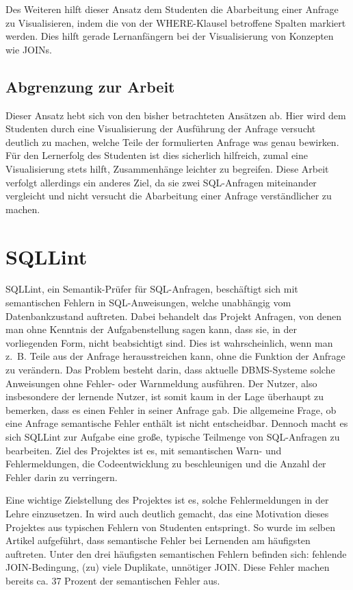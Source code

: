 Des Weiteren hilft dieser Ansatz dem Studenten die Abarbeitung einer Anfrage zu Visualisieren, indem die von der WHERE-Klausel betroffene Spalten markiert werden. Dies hilft gerade Lernanfängern bei der Visualisierung von Konzepten wie JOINs.

\subsection*{Abgrenzung zur Arbeit}

Dieser Ansatz hebt sich von den bisher betrachteten Ansätzen ab. Hier wird dem Studenten durch eine Visualisierung der Ausführung der Anfrage versucht deutlich zu machen, welche Teile der formulierten Anfrage was genau bewirken. Für den Lernerfolg des Studenten ist dies sicherlich hilfreich, zumal eine Visualisierung stets hilft, Zusammenhänge leichter zu begreifen. Diese Arbeit verfolgt allerdings ein anderes Ziel, da sie zwei SQL-Anfragen miteinander vergleicht und nicht versucht die Abarbeitung einer Anfrage verständlicher zu machen.

\section{SQLLint}

SQLLint, ein Semantik-Prüfer für SQL-Anfragen, beschäftigt sich mit semantischen Fehlern in SQL-Anweisungen, welche unabhängig vom Datenbankzustand auftreten. Dabei behandelt das Projekt Anfragen, von denen man ohne Kenntnis der Aufgabenstellung sagen kann, dass sie, in der vorliegenden Form, nicht beabsichtigt sind. Dies ist wahrscheinlich, wenn man \mbox{z. B.} Teile aus der Anfrage herausstreichen kann, ohne die Funktion der Anfrage zu verändern.  Das Problem besteht darin, dass aktuelle DBMS-Systeme solche Anweisungen ohne Fehler- oder Warnmeldung ausführen. Der Nutzer, also insbesondere der lernende Nutzer, ist somit kaum in der Lage überhaupt zu bemerken, dass es einen Fehler in seiner Anfrage gab. Die allgemeine Frage, ob eine Anfrage semantische Fehler enthält ist nicht entscheidbar. Dennoch macht es sich SQLLint zur Aufgabe eine große, typische Teilmenge von SQL-Anfragen zu bearbeiten. Ziel des Projektes ist es, mit semantischen Warn- und Fehlermeldungen, die Codeentwicklung zu beschleunigen und die Anzahl der Fehler darin zu verringern.

Eine wichtige Zielstellung des Projektes ist es, solche Fehlermeldungen in der Lehre einzusetzen. In \cite{sqllint1} wird auch deutlich gemacht, das eine Motivation dieses Projektes aus typischen Fehlern von Studenten entspringt. So wurde im selben Artikel aufgeführt, dass semantische Fehler bei Lernenden am häufigsten auftreten. Unter den drei häufigsten semantischen Fehlern befinden sich: fehlende JOIN-Bedingung, (zu) viele Duplikate, unnötiger JOIN. Diese Fehler machen bereits ca. 37 Prozent der semantischen Fehler aus.

